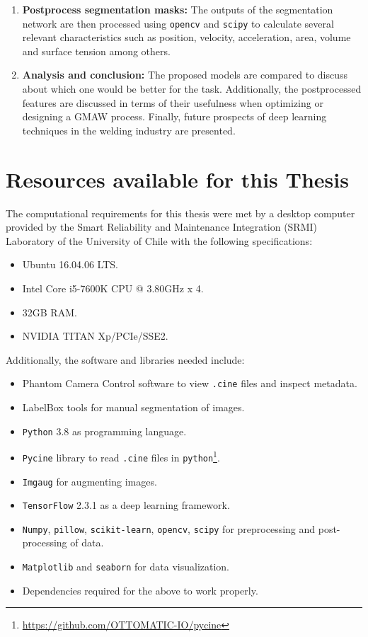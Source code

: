 \begin{enumerate}
    \item \textbf{Postprocess segmentation masks:}
    The outputs of the segmentation network are then processed using \texttt{opencv} and \texttt{scipy} to calculate several relevant characteristics such as position, velocity, acceleration, area, volume and surface tension among others.\\
    
    \item \textbf{Analysis and conclusion:}
    The proposed models are compared to discuss about which one would be better for the task. Additionally, the postprocessed features are discussed in terms of their usefulness when optimizing or designing a GMAW process. Finally, future prospects of deep learning techniques in the welding industry are presented.
    
\end{enumerate}

\section{Resources available for this Thesis}
The computational requirements for this thesis were met by a desktop computer provided by the Smart Reliability and Maintenance Integration (SRMI) Laboratory of the University of Chile with the following specifications:
\begin{itemize}
    \item Ubuntu 16.04.06 LTS.
    \item Intel Core i5-7600K CPU @ 3.80GHz x 4. 
    \item 32GB RAM.
    \item NVIDIA TITAN Xp/PCIe/SSE2.
\end{itemize}

Additionally, the software and libraries needed include:
\begin{itemize}
    \item Phantom Camera Control software to view \texttt{.cine} files and inspect metadata.
     \item LabelBox tools for manual segmentation of images.
    \item \texttt{Python} 3.8 as programming language.
    \item \texttt{Pycine} library to read \texttt{.cine} files in \texttt{python}\footnote{\url{https://github.com/OTTOMATIC-IO/pycine}}.
    \item \texttt{Imgaug} for augmenting images.
    \item \texttt{TensorFlow} 2.3.1 as a deep learning framework.
    \item \texttt{Numpy}, \texttt{pillow}, \texttt{scikit-learn}, \texttt{opencv}, \texttt{scipy} for preprocessing and post-processing of data.
    \item \texttt{Matplotlib} and \texttt{seaborn} for data visualization.
    \item Dependencies required for the above to work properly.
\end{itemize}

